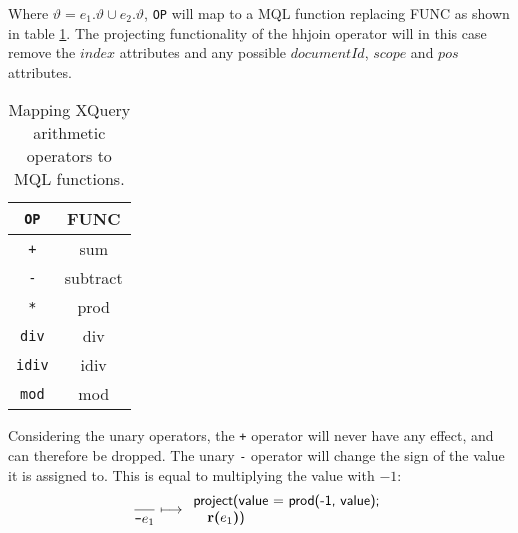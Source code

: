 Where $\vartheta = e_1.\vartheta \cup e_2.\vartheta$, \texttt{OP} will map to a MQL function replacing
\textsf{FUNC} as shown in table \ref{tab:trans:TD:binOpMap}. The projecting functionality of the
\textsf{hhjoin} operator will in this case remove the $index$ attributes and any possible $documentId$, $scope$
and $pos$ attributes.

\begin{table}[h]
\centering
\begin{tabular}{c|c}
\texttt{OP} & \textsf{FUNC} \\ \hline
\texttt{+} 	& \textsf{sum} \\
\texttt{-} 	& \textsf{subtract} \\
\texttt{*} 	& \textsf{prod} \\
\texttt{div} 	& \textsf{div} \\
\texttt{idiv} 	& \textsf{idiv} \\
\texttt{mod} 	& \textsf{mod} \\
\end{tabular}
\label{tab:trans:TD:binOpMap}
\caption{Mapping XQuery arithmetic operators to MQL functions.}
\end{table}

Considering the unary operators, the \texttt{+} operator will never have any effect, and can therefore be dropped.
The unary \texttt{-} operator will change the sign of the value it is assigned to. This is equal to multiplying
the value with $-1$:
\begin{equation}
\frac{}{\mbox{\texttt{-}}e_1}\longmapsto 
\begin{array}{l}
\mbox{\textsf{project(value = prod(-1, value);}} \\ \quad
\mbox{\textbf{r(}}e_1\mbox{\textbf{)}\textsf{)}}
\end{array}
\label{rule:trans:TD:unaryMin}
\end{equation}

